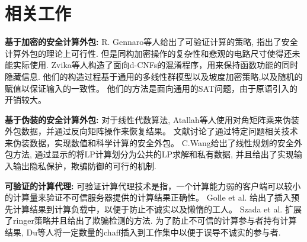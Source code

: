 %

\section{相关工作}
\textbf{基于加密的安全计算外包:}
R. Gennaro等人\cite{R.Gennaro}给出了可验证计算的策略,
指出了安全计算外包的理论上可行性.
但是同构加密操作的复杂性和悲观的电路尺寸使得还未能实际使用.
Zvika等人\cite{OBfuscationd-CNFs}构造了面向d-CNFs的混淆程序，用来保持函数功能的同时隐藏信息.
他们的构造过程基于通用的多线性群模型以及坡度加密策略,以及随机的赋值以保证输入的一致性。
他们的方法是面向通用的SAT问题，由于原语引入的开销较大。

\textbf{基于伪装的安全计算外包:}
对于线性代数算法,
Atallah等人\cite{t19}使用对角矩阵乘来伪装外包数据，并通过反向矩阵操作来恢复结果。
文献\cite{t20}讨论了通过特定问题相关技术来伪装数据，实现数值和科学计算的安全外包。
C.Wang\cite{c.WANG}给出了线性规划的安全外包方法,
通过显示的将LP计算划分为公共的LP求解和私有数据,
并且给出了实现输入输出隐私保护，欺骗防御的可行的机制.

\textbf{可验证的计算代理:}
可验证计算代理技术是指，一个计算能力弱的客户端可以较小的计算量来验证不可信服务器提供的计算结果正确性。
Golle et al. \cite{t32} 给出了插入预先计算结果到计算负载中，以便于防止不诚实以及懒惰的工人。
Szada et al. \cite{t33} 扩展了ringer策略并且给出了欺骗检测的方法.
为了防止不可信的计算参与者持有计算结果,
Du等人\cite{HV-grid}将一定数量的chaff插入到工作集中以便于误导不诚实的参与者.

